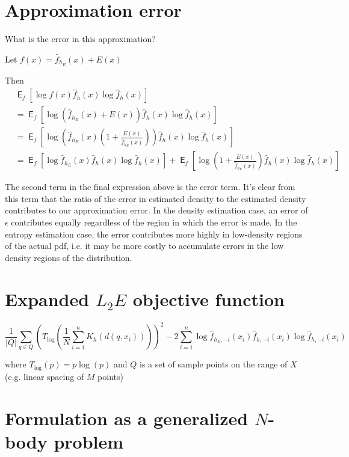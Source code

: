 \documentclass{article}
\DeclareMathOperator*{\E}{\mathsf{E}}
\begin{document}
  \section{Approximation error}

  What is the error in this approximation?

  Let $ f(x) = \hat{f}_{h_E}(x) + E(x) $

  Then
  \begin{align*}
    & \E_f[ \log f(x) \hat{f}_h(x) \log \hat{f}_h(x)]\\
    & = \E_f[ \log (\hat{f}_{h_E}(x) + E(x)) \hat{f}_h(x) \log \hat{f}_h(x)]\\
    & = \E_f[ \log \left( \hat{f}_{h_E}(x) (1 + \frac{E(x)}{\hat{f}_{h_E}(x)}) \right) \hat{f}_h(x) \log \hat{f}_h(x)]\\
    & = \E_f[ \log \hat{f}_{h_E}(x) \hat{f}_h(x) \log \hat{f}_h(x)] + \E_f[ \log \left( 1 + \frac{E(x)}{\hat{f}_{h_E}(x)} \right) \hat{f}_h(x) \log \hat{f}_h(x)]
  \end{align*}

  The second term in the final expression above is the error term. It's clear from this term that the ratio of the error in estimated density to the estimated density contributes to our approximation error. In the density estimation case, an error of $ \epsilon $ contributes equally regardless of the region in which the error is made. In the entropy estimation case, the error contributes more highly in low-density regions of the actual pdf, i.e. it may be more costly to accumulate errors in the low density regions of the distribution.


  \section{Expanded $L_2E$ objective function}

  \begin{displaymath}
    \frac{1}{\vert Q \vert} \sum_{q \in Q} \left( T_{\log} \left( \frac{1}{N} \sum_{i=1}^n K_h(d(q,x_i)) \right) \right) ^2 - 2 \sum_{i=1}^n \log \hat{f}_{h_E,-i}(x_i) \hat{f}_{h,-i}(x_i) \log \hat{f}_{h,-i}(x_i)
  \end{displaymath}

  where $ T_{\log}(p) = p \log(p) $ and $Q$ is a set of sample points on the range of $X$ (e.g. linear spacing of $M$ points)


  \section{Formulation as a generalized $N$-body problem}
\end{document}
